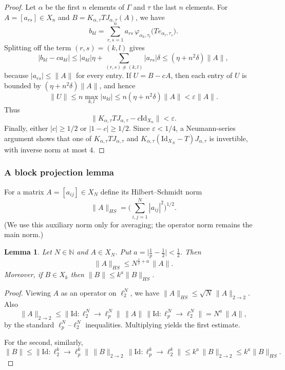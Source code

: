 \documentclass[11pt]{amsart}
\theoremstyle{plain}
\newtheorem{lemma}[theorem]{Lemma}
\theoremstyle{definition}
\numberwithin{equation}{section}
\newcommand{\norm}[1]{\lVert #1 \rVert}
\newcommand{\N}{\mathbb{N}}
\newcommand{\Id}{\mathrm{Id}}
\renewcommand{\le}{\leqslant}
\renewcommand{\ge}{\geqslant}
\begin{document}
\begin{proof}
Let $\alpha$ be the first $n$ elements of $\Gamma$ and $\tau$ the last $n$ elements.  For $A=[a_{rs}]\in X_n$ and
$B=K_{\alpha,\tau}TJ_{\alpha,\tau}(A)$, we have
\[
    b_{kl}=\sum_{r,s=1}^n a_{rs}\,
    \varphi_{\alpha_k,\tau_l}\bigl(T e_{\alpha_r,\tau_s}\bigr).
\]
Splitting off the term $(r,s)=(k,l)$ gives
\[
    |b_{kl}-c a_{kl}|
    \le |a_{kl}|\eta+\sum_{(r,s)\ne(k,l)} |a_{rs}|\delta
    \le (\eta+n^2\delta)\|A\|,
\]
because $|a_{rs}|\le\|A\|$ for every entry.  If $U=B-cA$, then each entry of $U$ is bounded by $(\eta+n^2\delta)\|A\|$, and hence
\[
    \|U\|\le n\max_{k,l}|u_{kl}|
    \le n(\eta+n^2\delta)\|A\|<\varepsilon\|A\|.
\]
Thus
\[
    \|K_{\alpha,\tau}TJ_{\alpha,\tau}-c\Id_{X_n}\|<\varepsilon.
\]
Finally, either $|c|\ge1/2$ or $|1-c|\ge1/2$.  Since $\varepsilon<1/4$, a Neumann-series argument shows that one of
$K_{\alpha,\tau}TJ_{\alpha,\tau}$ and $K_{\alpha,\tau}(\Id_{X_N}-T)J_{\alpha,\tau}$ is invertible, with inverse norm at most $4$.
\end{proof}

\subsubsection{A block projection lemma}

For a matrix $A=[a_{ij}]\in X_N$ define its Hilbert--Schmidt norm
\[
\norm{A}_{HS}=\Big(\sum_{i,j=1}^N |a_{ij}|^2\Big)^{1/2}.
\]
(We use this auxiliary norm only for averaging; the operator norm remains the main norm.)

\begin{lemma}\label{lem:hs-vs-op}
Let $N\in\N$ and $A\in X_N$.
Put $a=\big| \frac1p-\frac12\big|<\frac12$. Then
\[
\norm{A}_{HS}\le N^{\frac12+a}\,\norm{A}.
\]
Moreover, if $B\in X_k$ then $\norm{B}\le k^{a}\norm{B}_{HS}$.
\end{lemma}

\begin{proof}
Viewing $A$ as an operator on $\ell_2^N$, we have $\norm{A}_{HS}\le \sqrt{N}\,\norm{A}_{2\to2}$.
Also
\[
\norm{A}_{2\to2}
\le \norm{\Id\colon \ell_2^N\to \ell_p^N}\,\norm{A}\,\norm{\Id\colon \ell_p^N\to \ell_2^N}
= N^{a}\,\norm{A},
\]
by the standard $\ell_p^N$--$\ell_2^N$ inequalities. Multiplying yields the first estimate.

For the second, similarly,
\[
\norm{B}\le \norm{\Id:\ell_2^k\to\ell_p^k}\,\norm{B}_{2\to2}\,\norm{\Id:\ell_p^k\to\ell_2^k}\le k^{a}\,\norm{B}_{2\to2}
\le k^{a}\norm{B}_{HS}.
\]
\end{proof}
\end{document}
